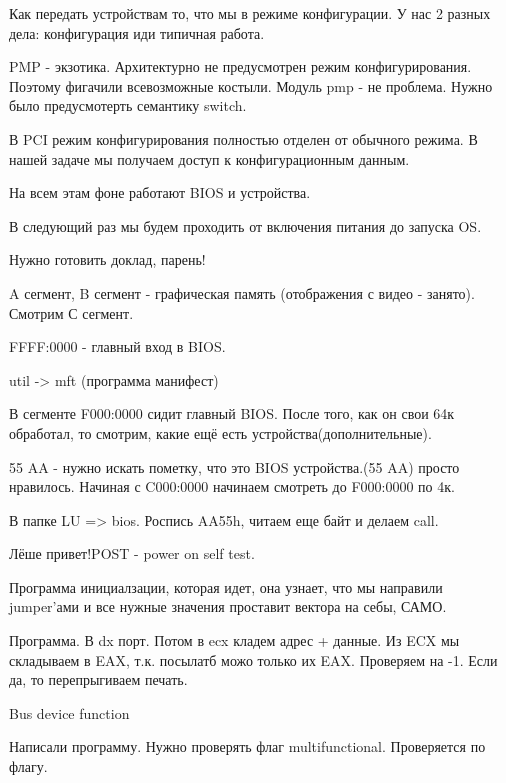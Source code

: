 Как передать устройствам то, что мы в режиме конфигурации. У нас 2 разных дела: конфигурация иди типичная работа. 

\begin{rem}
PMP - экзотика. Архитектурно не предусмотрен режим конфигурирования. Поэтому фигачили всевозможные костыли. Модуль pmp - не проблема. Нужно было предусмотерть семантику switch. 
 \end{rem}
 
В PCI режим конфигурирования полностью отделен от обычного режима. В нашей задаче мы получаем доступ к конфигурационным данным. 

На всем этам фоне работают BIOS и устройства.

В следующий раз мы будем проходить от включения питания до запуска OS.
\begin{hw}Нужно готовить доклад, парень!\end{hw}

A сегмент, B сегмент - графическая память (отображения с видео - занято). Смотрим С сегмент.

FFFF:0000 - главный вход в BIOS. 

util -> mft (программа манифест)

В сегменте F000:0000 сидит главный BIOS. После того, как он  свои 64к обработал, то смотрим, какие ещё есть устройства(дополнительные).

55 AA - нужно искать пометку, что это BIOS устройства.(55 AA) просто нравилось.
Начиная с C000:0000  начинаем смотреть до F000:0000 по 4к.


В папке LU => bios. Роспись AA55h, читаем еще байт и делаем call. 

\begin{rem}Лёше привет!POST - power on self test.
\end{rem}

Программа инициалзации, которая идет, она узнает, что мы направили jumper'ами и все нужные значения проставит вектора на себы, САМО. 

\newpage

Программа. В dx порт. Потом в ecx кладем адрес + данные. Из ECX мы складываем в EAX,  т.к. посылатб можо только их EAX. Проверяем на -1. Если да, то перепрыгиваем печать.

Bus device function

Написали программу.
Нужно проверять флаг multifunctional. Проверяется по флагу.


